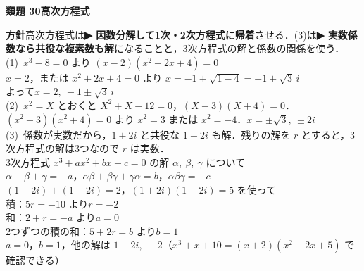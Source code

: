 \documentclass[a4paper,11pt]{ltjsarticle}
\newcommand{\ans}[2]{\Needspace{5\baselineskip}\vspace{6pt}%
  {\sffamily\bfseries 類題 #1\quad #2}\par}
\newcommand{\point}[1]{\textsf{\bfseries ▶ #1}}
\begin{document}
\ans{30}{高次方程式}
\begin{kai}
\textbf{方針}\quad 高次方程式は\point{因数分解して1次・2次方程式に帰着}させる．(3)は\point{実数係数なら共役な複素数も解}になることと，3次方程式の解と係数の関係を使う．\\[2pt]
(1)\ $x^3-8=0$ より $(x-2)(x^2+2x+4)=0$\\
\hspace*{1.5em}$x=2$，または $x^2+2x+4=0$ より $x=-1\pm\sqrt{1-4}=-1\pm\sqrt3\,i$\\
\hspace*{1.5em}よって\quad $x=2,\ -1\pm\sqrt3\,i$\\[2pt]
(2)\ $x^2=X$ とおくと $X^2+X-12=0$，$(X-3)(X+4)=0$．\\
\hspace*{1.5em}$(x^2-3)(x^2+4)=0$ より $x^2=3$ または $x^2=-4$．\quad $x=\pm\sqrt3,\ \pm2i$\\[2pt]
(3)\ 係数が実数だから，$1+2i$ と共役な $1-2i$ も解．残りの解を $r$ とすると，3次方程式の解は3つなので $r$ は実数．\\
\hspace*{1.5em}3次方程式 $x^3+ax^2+bx+c=0$ の解 $\alpha,\ \beta,\ \gamma$ について\\
\hspace*{1.5em}$\alpha+\beta+\gamma=-a$，\quad $\alpha\beta+\beta\gamma+\gamma\alpha=b$，\quad $\alpha\beta\gamma=-c$\\
\hspace*{1.5em}$(1+2i)+(1-2i)=2$，\quad $(1+2i)(1-2i)=5$ を使って\\
\hspace*{1.5em}積：$5r=-10$ より\quad $r=-2$\\
\hspace*{1.5em}和：$2+r=-a$ より\quad $a=0$\\
\hspace*{1.5em}2つずつの積の和：$5+2r=b$ より\quad $b=1$\\
\hspace*{1.5em}$a=0$，$b=1$，他の解は $1-2i,\ -2$\quad（$x^3+x+10=(x+2)(x^2-2x+5)$ で確認できる）
\end{kai}
\end{document}
